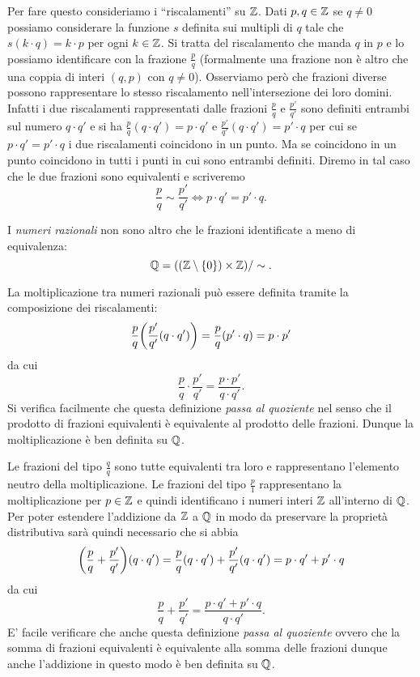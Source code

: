 Per fare questo consideriamo i ``riscalamenti'' su ${\mathbb Z}$. Dati $p,q\in {\mathbb Z}$ se 
$q\neq 0$ possiamo considerare la funzione $s$ definita sui multipli di $q$ 
tale che $s(k\cdot q) = k\cdot p$ per ogni $k\in {\mathbb Z}$.
Si tratta del riscalamento che manda $q$ in $p$ e lo possiamo identificare 
con la frazione $\frac{p}{q}$ (formalmente una frazione non è altro che una 
coppia di interi $(q,p)$ con $q\neq 0$).
Osserviamo però che frazioni diverse possono rappresentare lo stesso riscalamento 
nell'intersezione dei loro domini. 
Infatti i due riscalamenti rappresentati dalle frazioni $\frac{p}{q}$ e $\frac{p'}{q'}$
sono definiti entrambi sul numero $q\cdot q'$ e si ha
$\frac{p}{q}(q\cdot q') = p\cdot q'$ e  $\frac{p'}{q'}(q\cdot q')=p'\cdot q$ per cui se $p\cdot q'=p'\cdot q$
i due riscalamenti coincidono in un punto. Ma se coincidono in un punto coincidono 
in tutti i punti in cui sono entrambi definiti. 
Diremo in tal caso che le due frazioni sono equivalenti e scriveremo 
\[
  \frac{p}{q} \sim \frac{p'}{q'} \iff p\cdot q'=p'\cdot q.  
\]

I \emph{numeri razionali} non sono altro che le frazioni identificate 
a meno di equivalenza:
\[
  {\mathbb Q} = (({\mathbb Z}\setminus{\left\{ 0 \right\}})\times {\mathbb Z})/\sim.
\]

La moltiplicazione tra numeri razionali può essere definita tramite la composizione 
dei riscalamenti:
\[
  \frac{p}{q}{\left( \frac{p'}{q'} (q\cdot q') \right)} = \frac{p}{q}(p'\cdot q) = p\cdot p'
\]
da cui 
\[
 \frac{p}{q} \cdot \frac{p'}{q'} = \frac{p\cdot p'}{q\cdot q'}.  
\]
Si verifica facilmente che questa definizione \emph{passa al quoziente} 
nel senso che il prodotto di frazioni equivalenti è equivalente al prodotto 
delle frazioni. 
Dunque la moltiplicazione è ben definita su ${\mathbb Q}$.

Le frazioni del tipo $\frac{q}{q}$ sono tutte equivalenti tra loro e rappresentano 
l'elemento neutro della moltiplicazione.
Le frazioni del tipo $\frac{p}{1}$ rappresentano la moltiplicazione per $p\in{\mathbb Z}$ 
e quindi identificano i numeri interi ${\mathbb Z}$ all'interno di ${\mathbb Q}$.
Per poter estendere l'addizione da ${\mathbb Z}$ a ${\mathbb Q}$ in modo da preservare 
la proprietà distributiva sarà quindi necessario che 
si abbia 
\[
  {\left( \frac{p}{q}+\frac{p'}{q'} \right)} (q\cdot q') = \frac{p}{q}(q\cdot q') + \frac{p'}{q'}(q\cdot q')
  = p\cdot q' + p'\cdot q
\]
da cui
\[
  \frac{p}{q} + \frac{p'}{q'} = \frac{p\cdot q'+p'\cdot q}{q\cdot q'}.  
\]
E' facile verificare che anche questa definizione \emph{passa al quoziente}
ovvero che la somma di frazioni equivalenti è equivalente alla somma delle 
frazioni dunque anche l'addizione in questo modo è ben definita su ${\mathbb Q}$.

